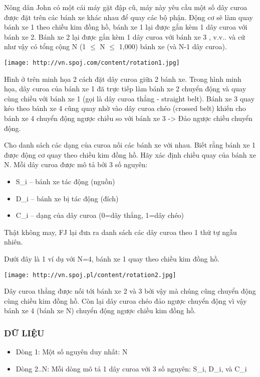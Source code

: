 



   Nông dân John có một cái máy gặt đập cũ, máy này yêu cầu một số dây  curoa được đặt trên các bánh xe khác nhau để quay các bộ phận. Động cơ sẽ làm quay bánh xe 1 theo chiều kim đồng hồ, bánh xe 1 lại được gắn kèm 1  dây curoa với bánh xe 2. Bánh xe 2 lại được gắn kèm 1 dây curoa với bánh xe 3  , v.v.. và cứ như vậy có tổng cộng N (1  $\le$  N  $\le$  1,000) bánh xe (và N-1 dây curoa).  


\texttt{[image: http://vn.spoj.com/content/rotation1.jpg]}

   Hình ở trên minh họa 2 cách đặt dây curoa giữa 2 bánh xe. Trong hình minh họa, dây curoa của bánh xe 1 đã trực tiếp làm bánh xe 2 chuyển động và quay cùng chiều với bánh xe 1 (gọi là dây curoa thẳng - straight belt). Bánh xe 3 quay kéo theo bánh xe 4 cũng quay nhờ vào dây curoa chéo (crossed belt) khiến cho bánh xe 4 chuyển động ngược chiều so với bánh xe 3 -> Đảo  ngược chiều chuyển động.  

   Cho danh sách các dạng của curoa nối các bánh xe với nhau.  Biết rằng bánh xe 1 được động cơ quay theo chiều kim đồng hồ. Hãy xác định chiều quay của bánh xe N. Mỗi dây curoa được mô tả bởi 3 số nguyên:  
\begin{itemize}
	\item     S\_i -- bánh xe tác động (nguồn)   
	\item     D\_i -- bánh xe bị tác động (đích)   
	\item     C\_i -- dạng của dây curoa (0=dây thẳng, 1=dây chéo)   
\end{itemize}

   Thật không may, FJ lại đưa ra danh sách các dây curoa theo 1 thứ tự ngẫu nhiên.  

   Dưới đây là 1 ví dụ với N=4, bánh xe 1 quay theo chiều kim đồng hồ.  


\texttt{[image: http://vn.spoj.pl/content/rotation2.jpg]}

   Dây curoa thẳng được nối tới bánh xe 2 và 3 bởi vậy mà chúng cũng chuyển động cùng chiều kim đồng hồ. Còn lại dây curoa chéo đảo ngược chuyển động vì vậy  bánh xe 4 (bánh xe N) chuyển động ngược chiều kim đồng hồ.  

\subsubsection{   DỮ LIỆU  }
\begin{itemize}
	\item     Dòng 1: Một số nguyên duy nhất: N   
	\item     Dòng 2..N: Mỗi dòng mô tả 1 dây curoa với 3 số nguyên: S\_i, D\_i, và C\_i   
\end{itemize}

